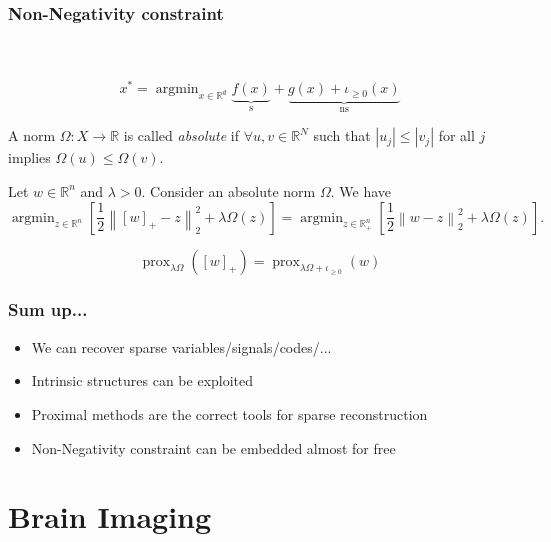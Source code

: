 \documentclass[aspectratio=169]{beamer}
\DeclareMathOperator{\Prox}{prox}
\newcommand{\prox}[2]{\Prox_{#1}\left({#2}\right)}
\newcommand{\RR}{\mathbb{R}}
\newcommand{\rd}{\mathbb{R}^d}
\newcommand{\normtwosq}[1]{\left\|#1\right\|_2^2}
\DeclareMathOperator*{\argmin}{argmin}
\begin{document}
		
		\begin{frame}
		\frametitle{Non-Negativity constraint}
		\quad \\ \quad \\
		
		\begin{equation}
		\nonumber x^* = \argmin_{x\in\rd} \underbrace{f(x)}_{\text{s}} + \underbrace{g(x) + \iota_{\ge 0}(x)}_{\text{ns}}
		\end{equation}
		
		\pause
		\begin{definition}
		A norm $\Omega: X\to \RR$ is called \emph{absolute} if $\forall u,v\in\RR^N$ such that $|u_j|\le |v_j|$ for all $j$ implies $\Omega(u)\le \Omega(v)$.
		\end{definition}
		
		\begin{theorem}
		Let $w\in\RR^n$ and $\lambda>0$. Consider an absolute norm $\Omega$. We have
		\begin{equation}
		\nonumber
		\argmin_{z\in\RR^n}\left[\frac{1}{2}\normtwosq{[w]_+ - z} + \lambda \Omega(z)\right] = \argmin_{z\in\RR^n_+}\left[\frac{1}{2}\normtwosq{w - z} + \lambda \Omega(z)\right].
		\end{equation}
		\end{theorem}
		\begin{equation}
		\nonumber
		\prox{\lambda\Omega}{[w]_+}  = \prox{\lambda\Omega+\iota_{\ge 0}}{w}
		\end{equation}
		\end{frame}
		
		
		\begin{frame}
		\frametitle{Sum up...}
		\begin{itemize}
		\item We can recover sparse variables/signals/codes/...
		\item Intrinsic structures can be exploited
		\item Proximal methods are the correct tools for sparse reconstruction
		\item Non-Negativity constraint can be embedded almost for free
		\end{itemize}
		\end{frame}
		
		\section{Brain Imaging}
		
\end{document}
